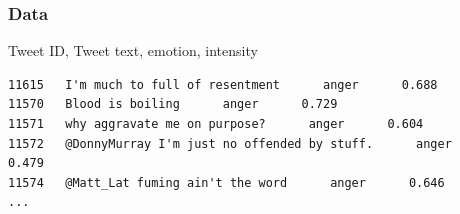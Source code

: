 \documentclass[10pt, compress]{beamer}
\begin{document}
\begin{frame}[fragile]
\frametitle{Data}

Tweet ID, Tweet text, emotion, intensity

{\small
\begin{verbatim}
11615   I'm much to full of resentment      anger      0.688
11570   Blood is boiling      anger      0.729
11571   why aggravate me on purpose?      anger      0.604
11572   @DonnyMurray I'm just no offended by stuff.      anger      0.479
11574   @Matt_Lat fuming ain't the word      anger      0.646
...
\end{verbatim}
}

\end{frame}




\end{document}
